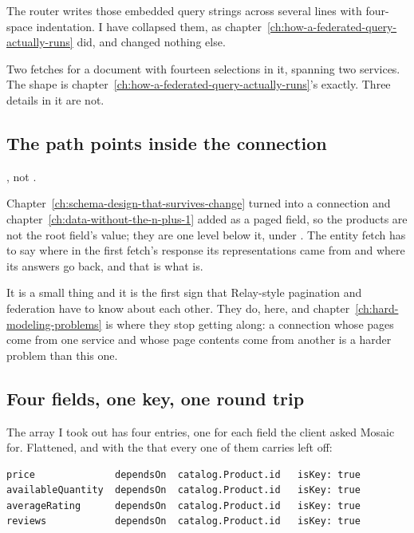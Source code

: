 %
The router writes those embedded query strings across several lines with
four-space indentation. I have collapsed them, as
chapter~\ref{ch:how-a-federated-query-actually-runs} did, and changed nothing
else.

Two fetches for a document with fourteen selections in it, spanning two
services. The shape is chapter~\ref{ch:how-a-federated-query-actually-runs}'s
exactly. Three details in it are not.

\subsection*{The path points inside the connection}

%
, not .

Chapter~\ref{ch:schema-design-that-survives-change} turned  into a
connection and chapter~\ref{ch:data-without-the-n-plus-1} added
 as a paged field, so the products are not the root field's
value; they are one level below it, under . The entity fetch has to
say where in the first fetch's response its representations came from and where
its answers go back, and that is what  is.

It is a small thing and it is the first sign that Relay-style pagination and
federation have to know about each other. They do, here, and
chapter~\ref{ch:hard-modeling-problems} is where they stop getting along: a
connection whose pages come from one service and whose page contents come from
another is a harder problem than this one.

\subsection*{Four fields, one key, one round trip}

%
The  array I took out has four entries, one for each field
the client asked Mosaic for. Flattened, and with the
 that every one of them carries left off:

\begin{verbatim}
price              dependsOn  catalog.Product.id   isKey: true
availableQuantity  dependsOn  catalog.Product.id   isKey: true
averageRating      dependsOn  catalog.Product.id   isKey: true
reviews            dependsOn  catalog.Product.id   isKey: true
\end{verbatim}


